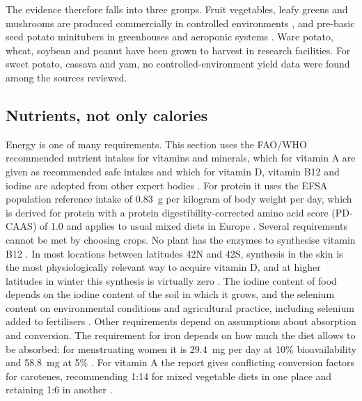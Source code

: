 The evidence therefore falls into three groups. Fruit vegetables, leafy greens and mushrooms are produced commercially in controlled environments \cite{cbs2026groenteteelt}\cite[Sections~2.1--2.2, pp.~2--3]{goglio2024agaricus}, and pre-basic seed potato minitubers in greenhouses and aeroponic systems \cite[p.~5]{cip2010aeroponics}. Ware potato, wheat, soybean and peanut have been grown to harvest in research facilities. For sweet potato, cassava and yam, no controlled-environment yield data were found among the sources reviewed.

\subsection{Nutrients, not only calories}\label{sec:nutrition-nutrients}

Energy is one of many requirements. This section uses the FAO/WHO recommended nutrient intakes for vitamins and minerals, which for vitamin A are given as recommended safe intakes and which for vitamin D, vitamin B12 and iodine are adopted from other expert bodies \cite[p.~xvi; pp.~35, 52, 284, 311]{faowho2004vitmin}. For protein it uses the EFSA population reference intake of 0.83~g per kilogram of body weight per day, which is derived for protein with a protein digestibility-corrected amino acid score (PD-CAAS) of 1.0 and applies to usual mixed diets in Europe \cite[Section~3.4, p.~19; Table~3, p.~24]{efsa2017drv}.%
 Several requirements cannot be met by choosing crops. No plant has the enzymes to synthesise vitamin B12 \cite[Section~14.1, p.~279]{faowho2004vitmin}. In most locations between latitudes 42\textdegree{}N and 42\textdegree{}S, synthesis in the skin is the most physiologically relevant way to acquire vitamin D, and at higher latitudes in winter this synthesis is virtually zero \cite[pp.~53--54]{faowho2004vitmin}. The iodine content of food depends on the iodine content of the soil in which it grows, and the selenium content on environmental conditions and agricultural practice, including selenium added to fertilisers \cite[p.~305; pp.~200--201]{faowho2004vitmin}. Other requirements depend on assumptions about absorption and conversion. The requirement for iron depends on how much the diet allows to be absorbed: for menstruating women it is 29.4~mg per day at 10\% bioavailability and 58.8~mg at 5\% \cite[Table~13.5, p.~271]{faowho2004vitmin}. For vitamin A the report gives conflicting conversion factors for carotenes, recommending 1:14 for mixed vegetable diets in one place and retaining 1:6 in another \cite[pp.~26, 29]{faowho2004vitmin}.

